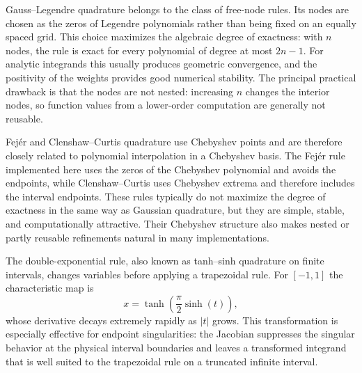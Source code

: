 Gauss--Legendre quadrature belongs to the class of free-node rules. Its nodes are
chosen as the zeros of Legendre polynomials rather than being fixed on an
equally spaced grid. This choice maximizes the algebraic degree of exactness:
with $n$ nodes, the rule is exact for every polynomial of degree at most
$2n-1$. For analytic integrands this usually produces geometric convergence, and
the positivity of the weights provides good numerical stability. The principal
practical drawback is that the nodes are not nested: increasing $n$ changes the
interior nodes, so function values from a lower-order computation are generally
not reusable.

Fejér and Clenshaw--Curtis quadrature use Chebyshev points and are therefore
closely related to polynomial interpolation in a Chebyshev basis. The Fejér rule
implemented here uses the zeros of the Chebyshev polynomial and avoids the
endpoints, while Clenshaw--Curtis uses Chebyshev extrema and therefore includes
the interval endpoints. These rules typically do not maximize the degree of
exactness in the same way as Gaussian quadrature, but they are simple, stable,
and computationally attractive. Their Chebyshev structure also makes nested or
partly reusable refinements natural in many implementations.

The double-exponential rule, also known as tanh--sinh quadrature on finite
intervals, changes variables before applying a trapezoidal rule. For
$[-1,1]$ the characteristic map is
\[
	x=\tanh\left(\frac{\pi}{2}\sinh(t)\right),
\]
whose derivative decays extremely rapidly as $|t|$ grows. This transformation is
especially effective for endpoint singularities: the Jacobian suppresses the
singular behavior at the physical interval boundaries and leaves a transformed
integrand that is well suited to the trapezoidal rule on a truncated infinite
interval.
